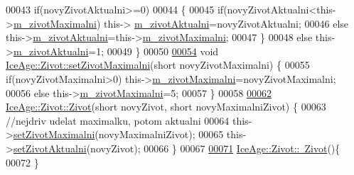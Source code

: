 \begin{DoxyCode}
00043     \textcolor{keywordflow}{if}(novyZivotAktualni>=0)
00044     \{
00045         \textcolor{keywordflow}{if}(novyZivotAktualni<this->\hyperlink{classIceAge_1_1Zivot_a256134d066a2b08095fc5a5fe50ac557}{m\_zivotMaximalni}) this->
      \hyperlink{classIceAge_1_1Zivot_a50f8dfc33d5affeb16709ee8e5b1e445}{m\_zivotAktualni}=novyZivotAktualni;
00046         \textcolor{keywordflow}{else} this->\hyperlink{classIceAge_1_1Zivot_a50f8dfc33d5affeb16709ee8e5b1e445}{m\_zivotAktualni}=this->\hyperlink{classIceAge_1_1Zivot_a256134d066a2b08095fc5a5fe50ac557}{m\_zivotMaximalni};
00047     \}
00048     \textcolor{keywordflow}{else} this->\hyperlink{classIceAge_1_1Zivot_a50f8dfc33d5affeb16709ee8e5b1e445}{m\_zivotAktualni}=1;
00049 \}
00050 
\hypertarget{Zivot_8cpp_source.tex_l00054}{}\hyperlink{classIceAge_1_1Zivot_a39f5216f0b6a6dcae8a41543ca41c3bb}{00054} \textcolor{keywordtype}{void} \hyperlink{classIceAge_1_1Zivot_a39f5216f0b6a6dcae8a41543ca41c3bb}{IceAge::Zivot::setZivotMaximalni}(\textcolor{keywordtype}{short} novyZivotMaximalni) \{
00055     \textcolor{keywordflow}{if}(novyZivotMaximalni>0) this->\hyperlink{classIceAge_1_1Zivot_a256134d066a2b08095fc5a5fe50ac557}{m\_zivotMaximalni}=novyZivotMaximalni;
00056     \textcolor{keywordflow}{else} this->\hyperlink{classIceAge_1_1Zivot_a256134d066a2b08095fc5a5fe50ac557}{m\_zivotMaximalni}=5;
00057 \}
00058 
\hypertarget{Zivot_8cpp_source.tex_l00062}{}\hyperlink{classIceAge_1_1Zivot_a97d6d435c5f046fdf0cf295fad6db7c6}{00062} \hyperlink{classIceAge_1_1Zivot_a97d6d435c5f046fdf0cf295fad6db7c6}{IceAge::Zivot::Zivot}(\textcolor{keywordtype}{short} novyZivot, \textcolor{keywordtype}{short} novyMaximalniZivot) \{
00063 \textcolor{comment}{//nejdriv udelat maximalku, potom aktualni}
00064     this->\hyperlink{classIceAge_1_1Zivot_a39f5216f0b6a6dcae8a41543ca41c3bb}{setZivotMaximalni}(novyMaximalniZivot);
00065     this->\hyperlink{classIceAge_1_1Zivot_ac09b749a9007fb4a02ea9d7f5000627c}{setZivotAktualni}(novyZivot);
00066 \}
00067 
\hypertarget{Zivot_8cpp_source.tex_l00071}{}\hyperlink{classIceAge_1_1Zivot_a998f76a4813dfecc610acbabdb037bae}{00071} \hyperlink{classIceAge_1_1Zivot_a998f76a4813dfecc610acbabdb037bae}{IceAge::Zivot::~Zivot}()\{
00072 \}
\end{DoxyCode}
